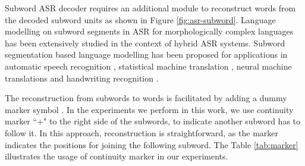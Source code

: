 Subword ASR decoder requires an additional module to reconstruct words from the
decoded subword units
as shown in Figure \ref{fig:asr-subword}. Language modelling on subword segments in
ASR for morphologically complex languages has been extensively studied
\cite{creutz2007morph,HIRSIMAKI2006515,povey2006, Wang2020,zhou21d_interspeech} in
the context of hybrid ASR systems.  Subword segmentation based language modelling has been
proposed for applications in automatic speech recognition
\cite{SMIT2021101158,creutz2007morph,sreeja-hybrid-2022,adiga-etal-2021-automatic,PASM2019},
statistical machine translation \cite{kunchukuttan2016}, neural machine
translations \cite{sennrich-etal-2016-neural,kudo-2018-subword} and handwriting
recognition \cite{singh2021online}.


The reconstruction from subwords to words is facilitated by adding a dummy
marker symbol \cite{SMIT2021101158}. In the experiments we perform in this
work, we use continuity marker ``{\mal +}" to the right side of the subwords,
to indicate another subword has to follow it. In this approach, reconstruction
is straightforward, as the marker indicates the positions for joining the
following subword. The Table \ref{tab:marker} illustrates the usage of continuity
marker in our experiments.







